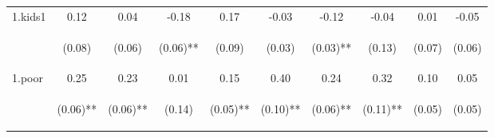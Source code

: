 \begin{center}
\begin{tabular}{lccccccccc}
\noalign{\smallskip}1.kids1 & 0.12 & 0.04 & -0.18 & 0.17 & -0.03 & -0.12 & -0.04 & 0.01 & -0.05\\
 & \begin{footnotesize}(0.08)\end{footnotesize} & \begin{footnotesize}(0.06)\end{footnotesize} & \begin{footnotesize}(0.06)**\end{footnotesize} & \begin{footnotesize}(0.09)\end{footnotesize} & \begin{footnotesize}(0.03)\end{footnotesize} & \begin{footnotesize}(0.03)**\end{footnotesize} & \begin{footnotesize}(0.13)\end{footnotesize} & \begin{footnotesize}(0.07)\end{footnotesize} & \begin{footnotesize}(0.06)\end{footnotesize}\\
\noalign{\smallskip}1.poor & 0.25 & 0.23 & 0.01 & 0.15 & 0.40 & 0.24 & 0.32 & 0.10 & 0.05\\
 & \begin{footnotesize}(0.06)**\end{footnotesize} & \begin{footnotesize}(0.06)**\end{footnotesize} & \begin{footnotesize}(0.14)\end{footnotesize} & \begin{footnotesize}(0.05)**\end{footnotesize} & \begin{footnotesize}(0.10)**\end{footnotesize} & \begin{footnotesize}(0.06)**\end{footnotesize} & \begin{footnotesize}(0.11)**\end{footnotesize} & \begin{footnotesize}(0.05)\end{footnotesize} & \begin{footnotesize}(0.05)\end{footnotesize}\\

\end{tabular}
\end{center}
